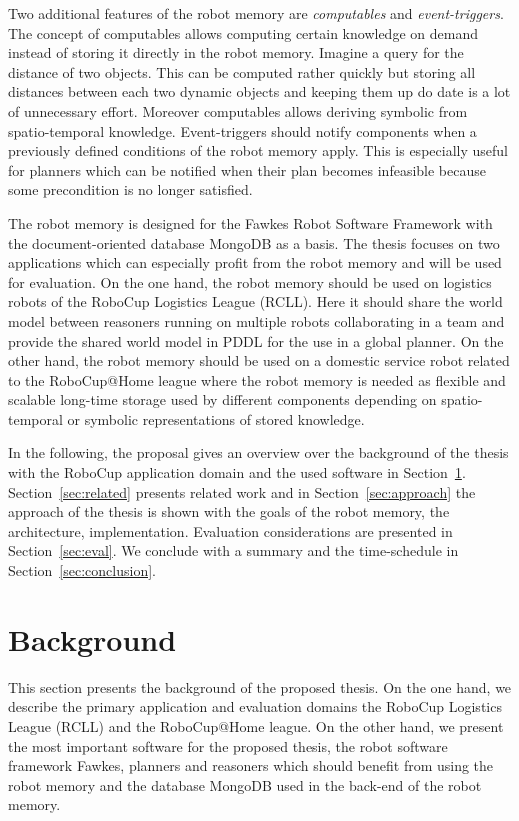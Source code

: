 \documentclass[a4paper,11pt]{article}
\newcommand{\refsec}[1]{Section~\ref{#1}}
\begin{document}
Two additional features of the robot memory are
\emph{computables} and
\emph{event-triggers}.  The concept of computables allows
computing certain knowledge on demand instead of storing it directly
in the robot memory. Imagine a query for the distance of two
objects. This can be computed rather quickly but storing all distances
between each two dynamic objects and keeping them up do date is a lot
of unnecessary effort. Moreover computables allows deriving
symbolic from spatio-temporal knowledge.  Event-triggers should notify
components when a previously defined conditions of the robot memory
apply. This is especially useful for planners which can be notified
when their plan becomes infeasible because some precondition is no
longer satisfied.

The robot memory is designed for the Fawkes Robot Software Framework
with the document-oriented database MongoDB as a basis.  The thesis
focuses on two applications which can especially profit from the robot
memory and will be used for evaluation. On the one hand, the robot
memory should be used on logistics robots of the RoboCup Logistics
League (RCLL). Here it should share the world model between reasoners
running on multiple robots collaborating in a team and provide the
shared world model in PDDL for the use in a global planner. On the
other hand, the robot memory should be used on a domestic service
robot related to the RoboCup@Home league where the robot memory is
needed as flexible and scalable long-time storage used by different
components depending on spatio-temporal or symbolic representations of
stored knowledge.

In the following, the proposal gives an overview over the background
of the thesis with the RoboCup application domain and the used
software in \refsec{sec:background}. \refsec{sec:related} presents
related work and in \refsec{sec:approach} the approach of the thesis
is shown with the goals of the robot memory, the architecture,
implementation. Evaluation considerations are presented in \refsec{sec:eval}.
We conclude with a summary and the time-schedule in \refsec{sec:conclusion}.


\section{Background}
\label{sec:background}
This section presents the background of the proposed thesis. On the
one hand, we describe the primary application and evaluation domains
the RoboCup Logistics League (RCLL) and the RoboCup@Home league.
On the other hand, we present
the most important software for the proposed thesis,
the robot software framework Fawkes, planners and
reasoners which should benefit from using the robot memory and
the database MongoDB used in the back-end of the robot memory.
\end{document}
